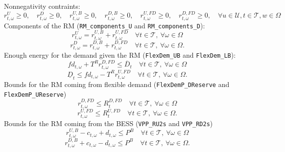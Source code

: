 Nonnegativity contraints:
\begin{equation} \label{EQ:RVarDef1}
    r^{U}_{t, \omega} \geq 0, \quad r^{D}_{t, \omega} \geq 0, \quad r^{U, B}_{t, \omega} \geq 0, \quad r^{D, B}_{t, \omega} \geq 0, \quad r^{U, FD}_{t, \omega} \geq 0, \quad r^{D, FD}_{t, \omega} \geq 0, \quad \forall u \in \mathcal{U}, t \in \mathcal{T}, w \in \Omega
\end{equation}
Components of the RM (\verb|RM_components_U| and \verb|RM_components_D|):
\begin{equation} \label{EQ:RUcomp1}
    r^{U}_{t, \omega} = r^{U, B}_{t, \omega} +  r^{U, FD}_{t, \omega} \quad \forall t \in \mathcal{T}, \ \forall \omega \in \Omega
\end{equation}
\begin{equation} \label{EQ:RDcomp1}
	r^{D}_{t, \omega} = r^{D, B}_{t, \omega} +  r^{D, FD}_{t, \omega} \quad \forall t \in \mathcal{T}, \ \forall \omega \in \Omega.
\end{equation}
Enough energy for the demand given the RM (\verb|FlexDem_UB| and \verb|FlexDem_LB|):
\begin{equation} \label{EQ:FlexDemand_UB1}
	fd_{t, \omega} + T^R r^{D, FD}_{t, \omega} \leq \overline{D}_t \quad \forall t \in \mathcal{T}, \ \forall \omega \in \Omega
\end{equation}
\begin{equation} \label{EQ:FlexDemand_LB1}
	\underline{D}_t \leq fd_{t, \omega} - T^R r^{U, FD}_{t, \omega} \quad \forall t \in \mathcal{T}, \ \forall \omega \in \Omega.
\end{equation}
Bounds for the RM coming from flexible demand (\verb|FlexDemP_DReserve| and \verb|FlexDemP_UReserve|)
\begin{equation} \label{EQ:FlexDemP_DReserve1}
	r^{D, FD}_{t, \omega} \leq R^{D, FD}_t \quad \forall t \in \mathcal{T}, \ \forall \omega \in \Omega
\end{equation}
\begin{equation} \label{EQ:FlexDemP_UReserve1}
	r^{U, FD}_{t, \omega} \leq R^{U, FD}_t \quad \forall t \in \mathcal{T}, \ \forall \omega \in \Omega.
\end{equation}
Bounds for the RM coming from the BESS (\verb|VPP_RU2s| and \verb|VPP_RD2s|)
\begin{equation} \label{EQ:VPP_RU2s1}
	r^{U, B} _{t, \omega} - c_{t, \omega} + d_{t, \omega}  \leq P^B \quad \forall t \in \mathcal{T}, \ \forall \omega \in \Omega
\end{equation}
\begin{equation} \label{EQ:VPP_RD2s1}
	r^{D, B}_{t, \omega} + c_{t, \omega} - d_{t, \omega} \leq P^B \quad \forall t \in \mathcal{T}, \ \forall \omega \in \Omega.
\end{equation}
